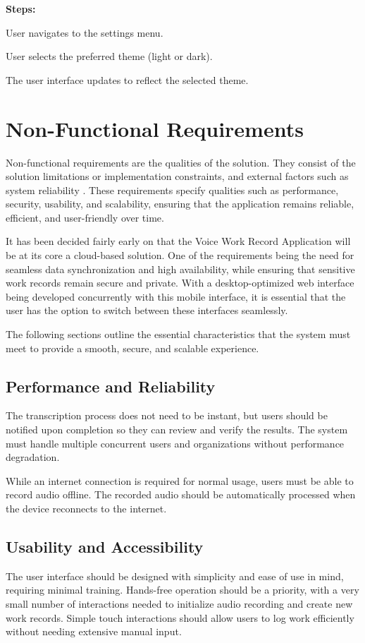 \documentclass[
  digital,     %
  oneside,     %
  nosansbold,  %
  nocolorbold, %
  lof,         %
  lot,         %
]{fithesis4}
\begin{document}
\noindent \textbf{Steps:}
\begin{compactenum}
    \item User navigates to the settings menu.
    \item User selects the preferred theme (light or dark).
    \item The user interface updates to reflect the selected theme.
\end{compactenum}

\section{Non-Functional Requirements}
Non-functional requirements are the qualities of the solution. They consist of the solution limitations or implementation constraints, and external factors such as system reliability \cite{delfinobook2015NonFunctionalRequirements}. These requirements specify qualities such as performance, security, usability, and scalability, ensuring that the application remains reliable, efficient, and user-friendly over time.  

It has been decided fairly early on that the Voice Work Record Application will be at its core a cloud-based solution. One of the requirements being the need for seamless data synchronization and high availability, while ensuring that sensitive work records remain secure and private. With a desktop-optimized web interface being developed concurrently with this mobile interface, it is essential that the user has the option to switch between these interfaces seamlessly.

The following sections outline the essential characteristics that the system must meet to provide a smooth, secure, and scalable experience.

\subsection{Performance and Reliability}  
The transcription process does not need to be instant, but users should be notified upon completion so they can review and verify the results. The system must handle multiple concurrent users and organizations without performance degradation.

While an internet connection is required for normal usage, users must be able to record audio offline. The recorded audio should be automatically processed when the device reconnects to the internet.

\subsection{Usability and Accessibility}  
The user interface should be designed with simplicity and ease of use in mind, requiring minimal training. Hands-free operation should be a priority, with a very small number of interactions needed to initialize audio recording and create new work records. Simple touch interactions should allow users to log work efficiently without needing extensive manual input.
\end{document}
